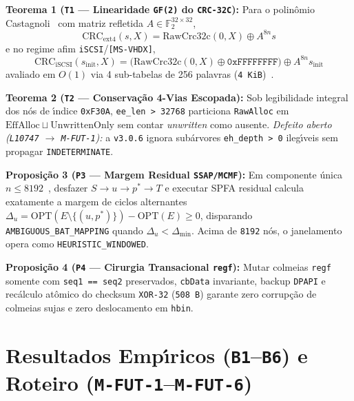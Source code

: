 \documentclass[10pt,twocolumn]{article}
\begin{document}
\textbf{Teorema 1 (\texttt{T1} --- Linearidade \texttt{GF(2)} do \texttt{CRC-32C}):} Para o polin\^{o}mio Castagnoli~\cite{R01,R02,R03} com matriz refletida $A \in \mathbb{F}_2^{32\times 32}$,
\begin{equation}
\mathrm{CRC}_{\mathrm{ext4}}(s,X) = \mathrm{RawCrc32c}(0,X) \oplus A^{8n} s
\end{equation}
e no regime afim \texttt{iSCSI}/\texttt{[MS-VHDX]},
\begin{equation}
\mathrm{CRC}_{\mathrm{iSCSI}}(s_{\mathrm{init}},X) = \bigl(\mathrm{RawCrc32c}(0,X) \oplus \texttt{0xFFFFFFFF}\bigr) \oplus A^{8n} s_{\mathrm{init}}
\end{equation}
avaliado em $O(1)$ via 4 sub-tabelas de 256 palavras (\texttt{4 KiB})~\cite{R18}.

\textbf{Teorema 2 (\texttt{T2} --- Conserva\c{c}\~{a}o 4-Vias Escopada):} Sob legibilidade integral dos n\'{o}s de \'{\i}ndice \texttt{0xF30A}, \texttt{ee\_len > 32768} particiona \texttt{RawAlloc} em $\mathrm{EffAlloc} \sqcup \mathrm{UnwrittenOnly}$ sem contar \emph{unwritten} como ausente. \emph{Defeito aberto (\texttt{L10747} $\to$ \texttt{M-FUT-1}):} a \texttt{v3.0.6} ignora sub\'{a}rvores \texttt{eh\_depth > 0} ileg\'{\i}veis sem propagar \texttt{INDETERMINATE}.

\textbf{Proposi\c{c}\~{a}o 3 (\texttt{P3} --- Margem Residual \texttt{SSAP/MCMF}):} Em componente \'{u}nica $n \le 8192$~\cite{R04,R05,R06}, desfazer $S \to u \to p^* \to T$ e executar SPFA residual calcula exatamente a margem de ciclos alternantes $\Delta_u = \mathrm{OPT}(E \setminus \{(u,p^*)\}) - \mathrm{OPT}(E) \ge 0$, disparando \texttt{AMBIGUOUS\_BAT\_MAPPING} quando $\Delta_u < \Delta_{\min}$. Acima de \texttt{8192} n\'{o}s, o janelamento opera como \texttt{HEURISTIC\_WINDOWED}.

\textbf{Proposi\c{c}\~{a}o 4 (\texttt{P4} --- Cirurgia Transacional \texttt{regf}):} Mutar colmeias \texttt{regf}~\cite{R25} somente com \texttt{seq1 == seq2} preservados, \texttt{cbData} invariante, backup \texttt{DPAPI} e rec\'{a}lculo at\^{o}mico do checksum \texttt{XOR-32} (\texttt{508 B}) garante zero corrup\c{c}\~{a}o de colmeias sujas e zero deslocamento em \texttt{hbin}.

\section{Resultados Emp\'{\i}ricos (\texttt{B1}--\texttt{B6}) e Roteiro (\texttt{M-FUT-1}--\texttt{M-FUT-6})}
\end{document}
